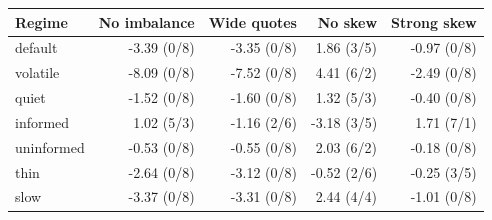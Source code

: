 \begin{tabular}{lrrrr}
\hline
Regime & No imbalance & Wide quotes & No skew & Strong skew\\
\hline
default & -3.39 (0/8) & -3.35 (0/8) & 1.86 (3/5) & -0.97 (0/8)\\
volatile & -8.09 (0/8) & -7.52 (0/8) & 4.41 (6/2) & -2.49 (0/8)\\
quiet & -1.52 (0/8) & -1.60 (0/8) & 1.32 (5/3) & -0.40 (0/8)\\
informed & 1.02 (5/3) & -1.16 (2/6) & -3.18 (3/5) & 1.71 (7/1)\\
uninformed & -0.53 (0/8) & -0.55 (0/8) & 2.03 (6/2) & -0.18 (0/8)\\
thin & -2.64 (0/8) & -3.12 (0/8) & -0.52 (2/6) & -0.25 (3/5)\\
slow & -3.37 (0/8) & -3.31 (0/8) & 2.44 (4/4) & -1.01 (0/8)\\
\hline
\end{tabular}